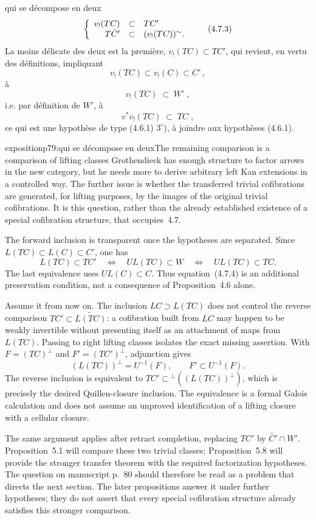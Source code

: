 qui se décompose en deux
\[
\left\{
\begin{array}{rcl}
v_{!}(TC) & \subset & TC' \\
T\tilde{C}' & \subset & (v_{!}(TC))^{\sim}.
\end{array}
\right.
\tag*{(4.7.3)}
\]
La moins délicate des deux est la  première, $v_{!}(TC) \subset TC'$, qui revient, en vertu des définitions, impliquant
\[
v_{!}(TC) \subset v_{!}(C) \subset C' \, ,
\]
à
\[
v_{!}(TC) \;\subset\; W' \; ,
\]
i.e. par définition de $W'$, à
\[
v^{*}v_{!}(TC) \;\subset\; TC \; ,
\tag*{(4.7.4)}
\]
ce qui est une hypothèse de type (4.6.1) $3^{\circ}$), à joindre aux hypothèses (4.6.1).

\begin{dcomment}{exposition}{p79:qui se décompose en deux}{The remaining comparison is a comparison of lifting classes}
Grothendieck has enough structure to factor arrows in the new category, but he needs more to derive arbitrary left Kan extensions in a controlled way. The further issue is whether the transferred trivial cofibrations are generated, for lifting purposes, by the images of the original trivial cofibrations. It is this question, rather than the already established existence of a special cofibration structure, that occupies~4.7.

The forward inclusion is transparent once the hypotheses are separated. Since $L(TC)\subset L(C)\subset C'$, one has
\[
 L(TC)\subset TC'
 \quad\Longleftrightarrow\quad UL(TC)\subset W
 \quad\Longleftrightarrow\quad UL(TC)\subset TC.
\]
The last equivalence uses $UL(C)\subset C$. Thus equation~(4.7.4) is an additional preservation condition, not a consequence of Proposition~4.6 alone.

Assume it from now on. The inclusion $LC\supset L(TC)$ does not control the reverse comparison $TC'\subset\widetilde{L(TC)}$: a cofibration built from $LC$ may happen to be weakly invertible without presenting itself as an attachment of maps from $L(TC)$. Passing to right lifting classes isolates the exact missing assertion. With $F=(TC)^{\perp}$ and $F'=(TC')^{\perp}$, adjunction gives
\[
 (L(TC))^{\perp}=U^{-1}(F),\qquad
 F'\subset U^{-1}(F).
\]
The reverse inclusion is equivalent to $TC'\subset{}^{\perp}((L(TC))^{\perp})$, which is precisely the desired Quillen-closure inclusion. The equivalence is a formal Galois calculation and does not assume an unproved identification of a lifting closure with a cellular closure.

The same argument applies after retract completion, replacing $TC'$ by $\widetilde{C'}\cap W'$. Proposition~5.1 will compare these two trivial classes; Proposition~5.8 will provide the stronger transfer theorem with the required factorization hypotheses. The question on manuscript p.~80 should therefore be read as a problem that directs the next section. The later propositions answer it under further hypotheses; they do not assert that every special cofibration structure already satisfies this stronger comparison.
\end{dcomment}


